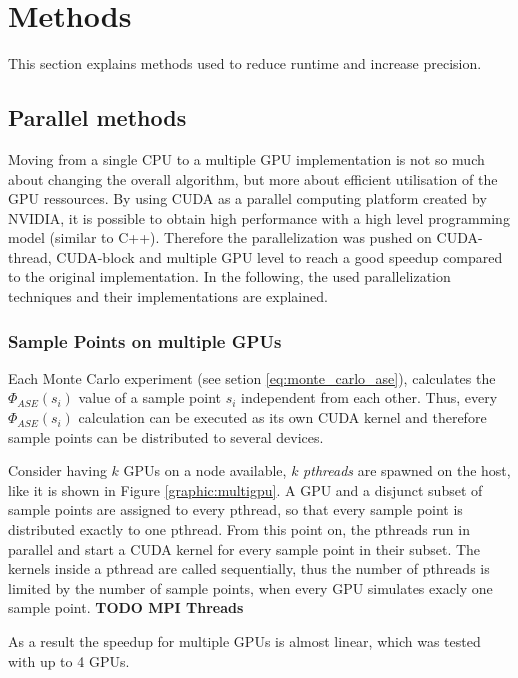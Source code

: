 \section{Methods}
This section explains methods used to reduce runtime and
increase precision.

\subsection{Parallel methods}
\label{subsec:parallel_methods}
Moving from a single CPU to a multiple
GPU implementation is not so much about changing the overall algorithm,
but more about efficient utilisation of the GPU ressources. 
By using CUDA\cite{cuda} as a parallel computing platform created by NVIDIA\cite{nvidia},
it is possible to obtain high performance with a high level 
programming model (similar to C++). Therefore the parallelization was pushed on CUDA-thread, 
CUDA-block and multiple GPU level to reach a good speedup compared to 
the original implementation.
In the following, the used parallelization
techniques and their implementations are explained.

\subsubsection{Sample Points on multiple GPUs}
\label{subsubsec:multigpu}

Each Monte Carlo experiment (see setion \ref{eq:monte_carlo_ase}), calculates the $\Phi_{ASE}(s_i)$ 
value of a sample point $s_i$ independent from each other.
Thus, every $\Phi_{ASE}(s_i)$ calculation can be executed as its own CUDA kernel
and therefore sample points can be distributed to several devices.

Consider having $k$ GPUs on a node available, 
$k$ \emph{pthreads} are spawned on the host, like it
is shown in Figure \ref{graphic:multigpu}. A GPU and a
disjunct subset of sample points are assigned to every pthread, so that every
sample point is distributed exactly to one pthread.
From this point on, the pthreads run in parallel and start a
CUDA kernel for every sample point in their subset.
The kernels inside a pthread are called sequentially,
thus the number of pthreads is limited by the number of sample points, when 
every GPU simulates exacly one sample point.
\textbf{TODO MPI Threads}

As a result the speedup for multiple
GPUs is almost linear, which was tested with up to 4 GPUs.
    
